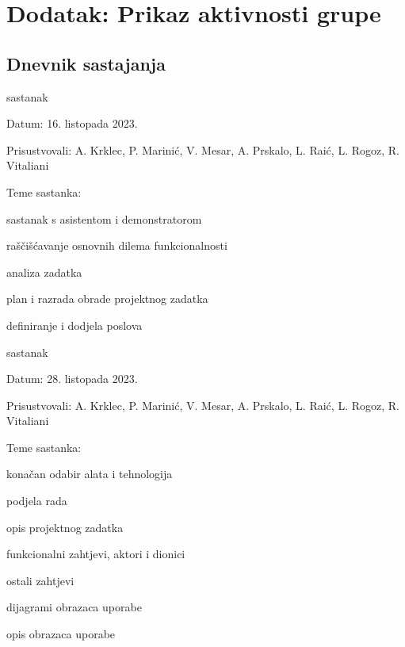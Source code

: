\chapter*{Dodatak: Prikaz aktivnosti grupe}

\section*{Dnevnik sastajanja}

\begin{packed_enum}
	\item  sastanak

	\item[] \begin{packed_item}
		\item Datum: 16. listopada 2023.
		\item Prisustvovali: A. Krklec, P. Marinić, V. Mesar, A. Prskalo, L. Raić, L. Rogoz, R. Vitaliani
		\item Teme sastanka:
		\begin{packed_item}
			\item sastanak s asistentom i demonstratorom
			\item raščišćavanje osnovnih dilema funkcionalnosti
			\item analiza zadatka
			\item plan i razrada obrade projektnog zadatka
			\item definiranje i dodjela poslova
		\end{packed_item}
	\end{packed_item}

	\item  sastanak
	\item[] \begin{packed_item}
		\item Datum: 28. listopada 2023.
		\item Prisustvovali: A. Krklec, P. Marinić, V. Mesar, A. Prskalo, L. Raić, L. Rogoz, R. Vitaliani
		\item Teme sastanka:
		\begin{packed_item}
			\item konačan odabir alata i tehnologija
			\item podjela rada
			\item opis projektnog zadatka
			\item funkcionalni zahtjevi, aktori i dionici
			\item ostali zahtjevi
			\item dijagrami obrazaca uporabe
			\item opis obrazaca uporabe
		\end{packed_item}
	\end{packed_item}


\end{packed_enum}
